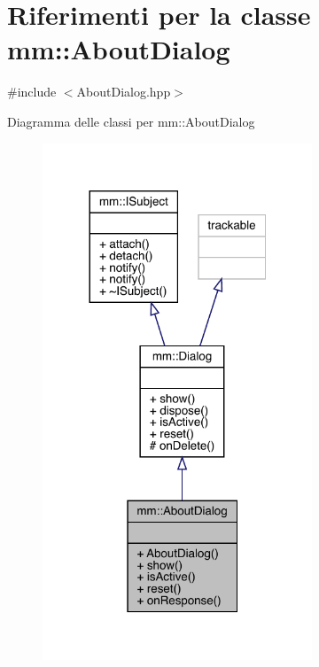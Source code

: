 \hypertarget{classmm_1_1_about_dialog}{}\section{Riferimenti per la classe mm\+:\+:About\+Dialog}
\label{classmm_1_1_about_dialog}


{\ttfamily \#include $<$About\+Dialog.\+hpp$>$}



Diagramma delle classi per mm\+:\+:About\+Dialog\nopagebreak
\begin{figure}[H]
\begin{center}
\leavevmode
\includegraphics[width=228pt]{d1/dfc/classmm_1_1_about_dialog__inherit__graph}
\end{center}
\end{figure}


